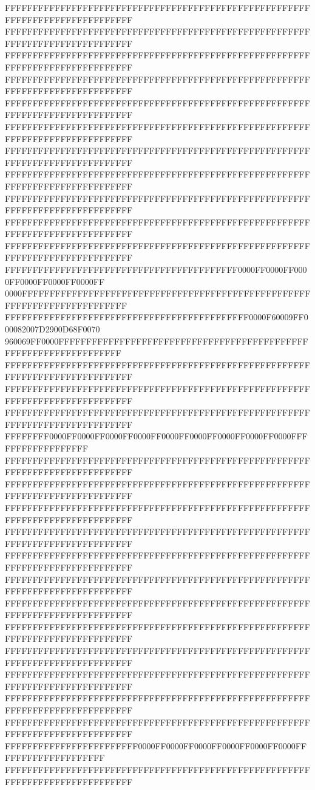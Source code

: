 FFFFFFFFFFFFFFFFFFFFFFFFFFFFFFFFFFFFFFFFFFFFFFFFFFFFFFFFFFFFFFFFFFFFFFFFFFFFFF
FFFFFFFFFFFFFFFFFFFFFFFFFFFFFFFFFFFFFFFFFFFFFFFFFFFFFFFFFFFFFFFFFFFFFFFFFFFFFF
FFFFFFFFFFFFFFFFFFFFFFFFFFFFFFFFFFFFFFFFFFFFFFFFFFFFFFFFFFFFFFFFFFFFFFFFFFFFFF
FFFFFFFFFFFFFFFFFFFFFFFFFFFFFFFFFFFFFFFFFFFFFFFFFFFFFFFFFFFFFFFFFFFFFFFFFFFFFF
FFFFFFFFFFFFFFFFFFFFFFFFFFFFFFFFFFFFFFFFFFFFFFFFFFFFFFFFFFFFFFFFFFFFFFFFFFFFFF
FFFFFFFFFFFFFFFFFFFFFFFFFFFFFFFFFFFFFFFFFFFFFFFFFFFFFFFFFFFFFFFFFFFFFFFFFFFFFF
FFFFFFFFFFFFFFFFFFFFFFFFFFFFFFFFFFFFFFFFFFFFFFFFFFFFFFFFFFFFFFFFFFFFFFFFFFFFFF
FFFFFFFFFFFFFFFFFFFFFFFFFFFFFFFFFFFFFFFFFFFFFFFFFFFFFFFFFFFFFFFFFFFFFFFFFFFFFF
FFFFFFFFFFFFFFFFFFFFFFFFFFFFFFFFFFFFFFFFFFFFFFFFFFFFFFFFFFFFFFFFFFFFFFFFFFFFFF
FFFFFFFFFFFFFFFFFFFFFFFFFFFFFFFFFFFFFFFFFFFFFFFFFFFFFFFFFFFFFFFFFFFFFFFFFFFFFF
FFFFFFFFFFFFFFFFFFFFFFFFFFFFFFFFFFFFFFFFFFFFFFFFFFFFFFFFFFFFFFFFFFFFFFFFFFFFFF
FFFFFFFFFFFFFFFFFFFFFFFFFFFFFFFFFFFFFFFFFF0000FF0000FF0000FF0000FF0000FF0000FF
0000FFFFFFFFFFFFFFFFFFFFFFFFFFFFFFFFFFFFFFFFFFFFFFFFFFFFFFFFFFFFFFFFFFFFFFFFFF
FFFFFFFFFFFFFFFFFFFFFFFFFFFFFFFFFFFFFFFFFFFF0000F60009FF000082007D2900D68F0070
960069FF0000FFFFFFFFFFFFFFFFFFFFFFFFFFFFFFFFFFFFFFFFFFFFFFFFFFFFFFFFFFFFFFFFFF
FFFFFFFFFFFFFFFFFFFFFFFFFFFFFFFFFFFFFFFFFFFFFFFFFFFFFFFFFFFFFFFFFFFFFFFFFFFFFF
FFFFFFFFFFFFFFFFFFFFFFFFFFFFFFFFFFFFFFFFFFFFFFFFFFFFFFFFFFFFFFFFFFFFFFFFFFFFFF
FFFFFFFFFFFFFFFFFFFFFFFFFFFFFFFFFFFFFFFFFFFFFFFFFFFFFFFFFFFFFFFFFFFFFFFFFFFFFF
FFFFFFFF0000FF0000FF0000FF0000FF0000FF0000FF0000FF0000FF0000FFFFFFFFFFFFFFFFFF
FFFFFFFFFFFFFFFFFFFFFFFFFFFFFFFFFFFFFFFFFFFFFFFFFFFFFFFFFFFFFFFFFFFFFFFFFFFFFF
FFFFFFFFFFFFFFFFFFFFFFFFFFFFFFFFFFFFFFFFFFFFFFFFFFFFFFFFFFFFFFFFFFFFFFFFFFFFFF
FFFFFFFFFFFFFFFFFFFFFFFFFFFFFFFFFFFFFFFFFFFFFFFFFFFFFFFFFFFFFFFFFFFFFFFFFFFFFF
FFFFFFFFFFFFFFFFFFFFFFFFFFFFFFFFFFFFFFFFFFFFFFFFFFFFFFFFFFFFFFFFFFFFFFFFFFFFFF
FFFFFFFFFFFFFFFFFFFFFFFFFFFFFFFFFFFFFFFFFFFFFFFFFFFFFFFFFFFFFFFFFFFFFFFFFFFFFF
FFFFFFFFFFFFFFFFFFFFFFFFFFFFFFFFFFFFFFFFFFFFFFFFFFFFFFFFFFFFFFFFFFFFFFFFFFFFFF
FFFFFFFFFFFFFFFFFFFFFFFFFFFFFFFFFFFFFFFFFFFFFFFFFFFFFFFFFFFFFFFFFFFFFFFFFFFFFF
FFFFFFFFFFFFFFFFFFFFFFFFFFFFFFFFFFFFFFFFFFFFFFFFFFFFFFFFFFFFFFFFFFFFFFFFFFFFFF
FFFFFFFFFFFFFFFFFFFFFFFFFFFFFFFFFFFFFFFFFFFFFFFFFFFFFFFFFFFFFFFFFFFFFFFFFFFFFF
FFFFFFFFFFFFFFFFFFFFFFFFFFFFFFFFFFFFFFFFFFFFFFFFFFFFFFFFFFFFFFFFFFFFFFFFFFFFFF
FFFFFFFFFFFFFFFFFFFFFFFFFFFFFFFFFFFFFFFFFFFFFFFFFFFFFFFFFFFFFFFFFFFFFFFFFFFFFF
FFFFFFFFFFFFFFFFFFFFFFFFFFFFFFFFFFFFFFFFFFFFFFFFFFFFFFFFFFFFFFFFFFFFFFFFFFFFFF
FFFFFFFFFFFFFFFFFFFFFFFF0000FF0000FF0000FF0000FF0000FF0000FFFFFFFFFFFFFFFFFFFF
FFFFFFFFFFFFFFFFFFFFFFFFFFFFFFFFFFFFFFFFFFFFFFFFFFFFFFFFFFFFFFFFFFFFFFFFFFFFFF
